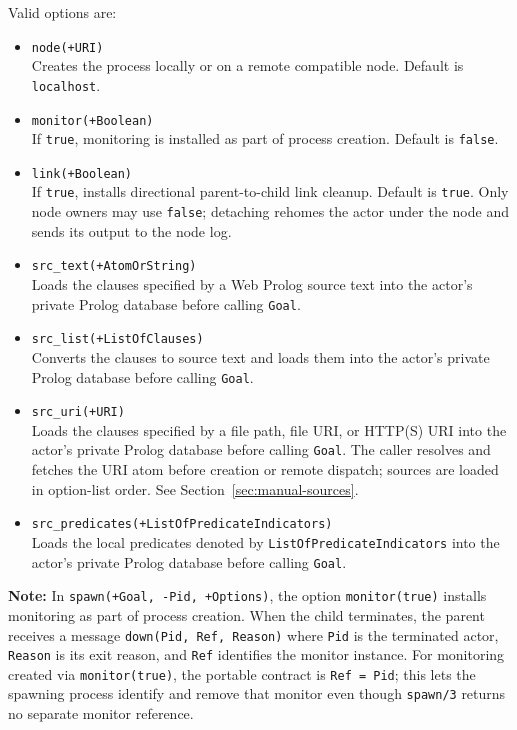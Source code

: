 Valid options are:

\begin{itemize}
\item
  \texttt{node(\allowbreak{}+URI)}\\
  Creates the process locally or on a remote compatible node. Default is
  \texttt{localhost}.
\item
  \texttt{monitor(\allowbreak{}+Boolean)}\\
  If \texttt{true}, monitoring is installed as part of process creation.
  Default is \texttt{false}.
\item
  \texttt{link(\allowbreak{}+Boolean)}\\
  If \texttt{true}, installs directional parent-to-child link cleanup.
  Default is \texttt{true}. Only node owners may use \texttt{false};
  detaching rehomes the actor under the node and sends its output to the node log.
\item
  \texttt{src\_\allowbreak{}text(\allowbreak{}+AtomOrString)}\\
  Loads the clauses specified by a Web Prolog source text into the actor's
  private Prolog database before calling \texttt{Goal}.
\item
  \texttt{src\_\allowbreak{}list(\allowbreak{}+ListOfClauses)}\\
  Converts the clauses to source text and loads them into the actor's private
  Prolog database before calling \texttt{Goal}.
\item
  \texttt{src\_\allowbreak{}uri(\allowbreak{}+URI)}\\
  Loads the clauses specified by a file path, file URI, or HTTP(S) URI into
  the actor's private Prolog database before calling \texttt{Goal}.
  The caller resolves and fetches the URI atom before creation or remote
  dispatch; sources are loaded in option-list order. See
  Section~\ref{sec:manual-sources}.
\item
  \texttt{src\_\allowbreak{}predicates(\allowbreak{}+ListOfPredicateIndicators)}\\
  Loads the local predicates denoted by
  \texttt{ListOfPredicateIndicators} into the actor's private Prolog database
  before calling \texttt{Goal}.
\end{itemize}

\noindent \textbf{Note:} In \texttt{spawn(\allowbreak{}+Goal,\allowbreak{}\,\allowbreak{}-Pid,\allowbreak{}\,\allowbreak{}+Options)}, the option
\texttt{monitor(\allowbreak{}true)} installs monitoring as part of process creation. When
the child terminates, the parent receives a message
\texttt{down(\allowbreak{}Pid,\allowbreak{}\,\allowbreak{}Ref,\allowbreak{}\,\allowbreak{}Reason)} where \texttt{Pid} is the terminated actor,
\texttt{Reason} is its exit reason, and \texttt{Ref} identifies the monitor
instance. For monitoring created via \texttt{monitor(\allowbreak{}true)}, the portable
contract is \texttt{Ref\,\allowbreak{}=\,\allowbreak{}Pid}; this lets the spawning process
identify and remove that monitor even though \texttt{spawn/\allowbreak{}3} returns no
separate monitor reference.\\

